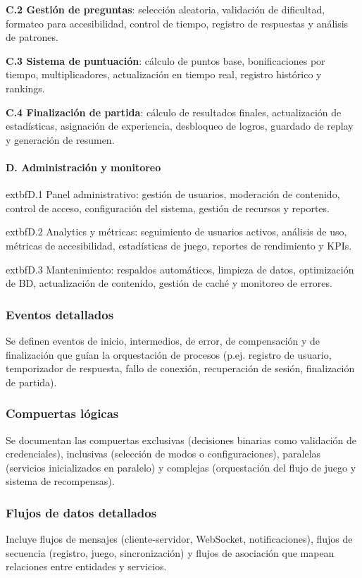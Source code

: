 \documentclass[12pt]{article}
\begin{document}
  \textbf{C.2 Gestión de preguntas}: selección aleatoria, validación de dificultad, formateo para accesibilidad, control de tiempo, registro de respuestas y análisis de patrones.

  \textbf{C.3 Sistema de puntuación}: cálculo de puntos base, bonificaciones por tiempo, multiplicadores, actualización en tiempo real, registro histórico y rankings.

  \textbf{C.4 Finalización de partida}: cálculo de resultados finales, actualización de estadísticas, asignación de experiencia, desbloqueo de logros, guardado de replay y generación de resumen.

\paragraph{D. Administración y monitoreo}
  extbf{D.1 Panel administrativo}: gestión de usuarios, moderación de contenido, control de acceso, configuración del sistema, gestión de recursos y reportes.

  extbf{D.2 Analytics y métricas}: seguimiento de usuarios activos, análisis de uso, métricas de accesibilidad, estadísticas de juego, reportes de rendimiento y KPIs.

  extbf{D.3 Mantenimiento}: respaldos automáticos, limpieza de datos, optimización de BD, actualización de contenido, gestión de caché y monitoreo de errores.

\subsubsection*{Eventos detallados}
Se definen eventos de inicio, intermedios, de error, de compensación y de finalización que guían la orquestación de procesos (p.ej. registro de usuario, temporizador de respuesta, fallo de conexión, recuperación de sesión, finalización de partida).

\subsubsection*{Compuertas lógicas}
Se documentan las compuertas exclusivas (decisiones binarias como validación de credenciales), inclusivas (selección de modos o configuraciones), paralelas (servicios inicializados en paralelo) y complejas (orquestación del flujo de juego y sistema de recompensas).

\subsubsection*{Flujos de datos detallados}
Incluye flujos de mensajes (cliente-servidor, WebSocket, notificaciones), flujos de secuencia (registro, juego, sincronización) y flujos de asociación que mapean relaciones entre entidades y servicios.
\end{document}
